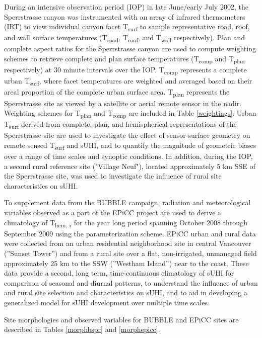 \begin{bibunit}
During an intensive observation period (IOP) in late June/early July 2002, the Sperrstrasse canyon was instrumented with an array of infrared thermometers (IRT) to view individual canyon facet T\textsubscript{surf} to sample representative road, roof, and wall surface temperatures (T\textsubscript{road}, T\textsubscript{roof}, and T\textsubscript{wall} respectively). Plan and complete aspect ratios for the Sperrstrasse canyon are used to compute weighting schemes to retrieve complete and plan surface temperatures (T\textsubscript{comp} and T\textsubscript{plan} respectively) at 30 minute intervals over the IOP. T\textsubscript{comp} represents a complete urban T\textsubscript{surf}, where facet temperatures are weighted and averaged based on their areal proportion of the complete urban surface area. T\textsubscript{plan} represents the Sperrstrasse site as viewed by a satellite or aerial remote sensor in the nadir. Weighting schemes for T\textsubscript{plan} and T\textsubscript{comp} are included in Table \ref{weightings}. Urban T\textsubscript{surf} derived from complete, plan, and hemispherical representations of the Sperrstrasse site are used to investigate the effect of sensor-surface geometry on remote sensed T\textsubscript{surf} and sUHI, and to quantify the magnitude of geometric biases over a range of time scales and synoptic conditions. In addition, during the IOP, a second rural reference site ("Village Neuf"), located approximately 5 \si{\kilo\meter} SSE of the Sperrstrasse site, was used to investigate the influence of rural site characteristics on sUHI. 

To supplement data from the BUBBLE campaign, radiation and meteorological variables observed as a part of the EPiCC project are used to derive a climatology of T\textsubscript{hem, r} for the year long period spanning October 2008 through September 2009 using the parameterization scheme. EPiCC urban and rural data were collected from an urban residential neighborhood site in central Vancouver (”Sunset Tower”) and from a rural site over a flat, non-irrigated, unmanaged field approximately 25 km to the SSW (”Westham Island”) near to the coast.  These data provide a second, long term, time-continuous climatology of sUHI for comparison of seasonal and diurnal patterns, to understand the influence of urban and rural site selection and characteristics on sUHI, and to aid in developing a generalized model for sUHI development over multiple time scales. 

Site morphologies and observed variables for BUBBLE and EPiCC sites are described in Tables \ref{morphbspr} and \ref{morphepicc}.


\end{bibunit}

